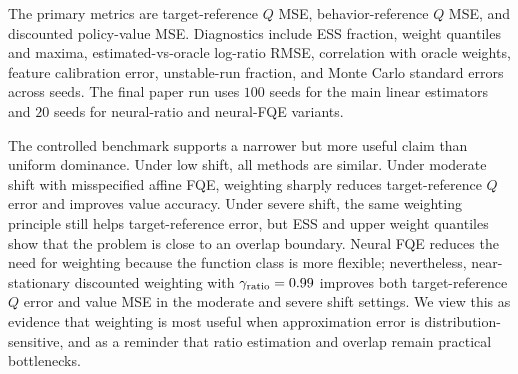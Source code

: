 The primary metrics are target-reference \(Q\) MSE, behavior-reference \(Q\)
MSE, and discounted policy-value MSE. Diagnostics include ESS fraction, weight
quantiles and maxima, estimated-vs-oracle log-ratio RMSE, correlation with
oracle weights, feature calibration error, unstable-run fraction, and Monte
Carlo standard errors across seeds. The final paper run uses \(100\) seeds for
the main linear estimators and \(20\) seeds for neural-ratio and neural-FQE
variants.



The controlled benchmark supports a narrower but more useful claim than
uniform dominance. Under low shift, all methods are similar. Under moderate
shift with misspecified affine FQE, weighting sharply reduces target-reference
\(Q\) error and improves value accuracy. Under severe shift, the same weighting
principle still helps target-reference error, but ESS and upper weight quantiles
show that the problem is close to an overlap boundary. Neural FQE reduces the
need for weighting because the function class is more flexible; nevertheless,
near-stationary discounted weighting with \(\gamma_{\rm ratio}=0.99\) improves
both target-reference \(Q\) error and value MSE in the moderate and severe
shift settings. We view this as evidence that weighting is most useful when
approximation error is distribution-sensitive, and as a reminder that ratio
estimation and overlap remain practical bottlenecks.

